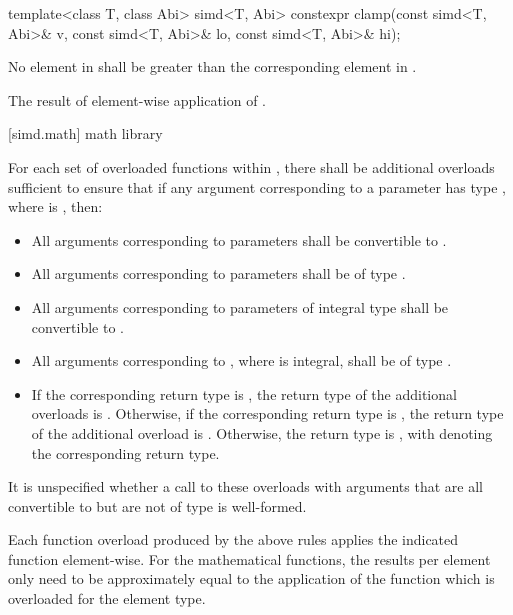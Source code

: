 \begin{itemdecl}
template<class T, class Abi> simd<T, Abi>
  constexpr clamp(const simd<T, Abi>& v, const simd<T, Abi>& lo, const simd<T, Abi>& hi);
\end{itemdecl}

\begin{itemdescr}
  \pnum\requires
  No element in  shall be greater than the corresponding element in .

  \pnum\returns
  The result of element-wise application of  \foralli.
\end{itemdescr}

[simd.math]{\texorpdfstring{ math}{simd math} library}

\pnum
For each set of overloaded functions within , there shall be additional overloads sufficient to ensure that if any argument corresponding to a  parameter has type , where  is , then:
\begin{itemize}
  \item All arguments corresponding to  parameters shall be convertible to .
  \item All arguments corresponding to  parameters shall be of type .
  \item All arguments corresponding to parameters of integral type  shall be convertible to .
  \item All arguments corresponding to , where  is integral, shall be of type .
  \item If the corresponding return type is , the return type of the additional overloads is . Otherwise, if the corresponding return type is , the return type of the additional overload is . Otherwise, the return type is , with  denoting the corresponding return type.
\end{itemize}
It is unspecified whether a call to these overloads with arguments that are all convertible to  but are not of type  is well-formed.

\pnum
Each function overload produced by the above rules applies the indicated  function element-wise. For the mathematical functions, the results per element only need to be approximately equal to the application of the function which is overloaded for the element type.

